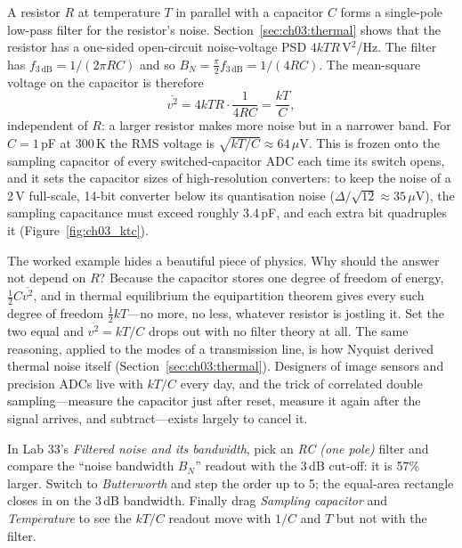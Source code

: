 
\begin{worked}
A resistor $R$ at temperature $T$ in parallel with a capacitor $C$ forms a single-pole low-pass
filter for the resistor's noise. Section~\ref{sec:ch03:thermal} shows that the resistor has a
one-sided open-circuit noise-voltage PSD $4kTR$\,V$^2$/Hz. The filter has
$f_{3\,\mathrm{dB}}=1/(2\pi RC)$ and so $B_N=\frac\pi2f_{3\,\mathrm{dB}}=1/(4RC)$. The mean-square
voltage on the capacitor is therefore
\[
\overline{v^2}=4kTR\cdot\frac{1}{4RC}=\frac{kT}{C},
\]
independent of $R$: a larger resistor makes more noise but in a narrower band. For $C=1$\,pF at
300\,K the RMS voltage is $\sqrt{kT/C}\approx64\,\mu$V. This  is frozen onto the
sampling capacitor of every switched-capacitor ADC each time its switch opens, and it sets the
capacitor sizes of high-resolution converters: to keep the noise of a 2\,V full-scale, 14-bit
converter below its quantisation noise ($\Delta/\sqrt{12}\approx35\,\mu$V), the sampling capacitance
must exceed roughly 3.4\,pF, and each extra bit quadruples it (Figure~\ref{fig:ch03_ktc}).
\end{worked}

The worked example hides a beautiful piece of physics. Why should the answer not depend on $R$? Because
the capacitor stores one degree of freedom of energy, $\tfrac12C\overline{v^2}$, and in thermal
equilibrium the equipartition theorem gives every such degree of freedom $\tfrac12kT$---no more, no
less, whatever resistor is jostling it. Set the two equal and $\overline{v^2}=kT/C$ drops out with no
filter theory at all. The same reasoning, applied to the modes of a transmission line, is how Nyquist
derived thermal noise itself (Section~\ref{sec:ch03:thermal}). Designers of image sensors and
precision ADCs live with $kT/C$ every day, and the trick of correlated double sampling---measure the
capacitor just after reset, measure it again after the signal arrives, and subtract---exists largely
to cancel it.

\begin{tryit}
In Lab 33's \emph{Filtered noise and its bandwidth}, pick an \emph{RC (one pole)} filter and compare
the ``noise bandwidth $B_N$'' readout with the 3\,dB cut-off: it is 57\% larger. Switch to
\emph{Butterworth} and step the order up to 5; the equal-area rectangle closes in on the 3\,dB
bandwidth. Finally drag \emph{Sampling capacitor} and \emph{Temperature} to see the $kT/C$ readout
move with $1/C$ and $T$ but not with the filter.
\end{tryit}

